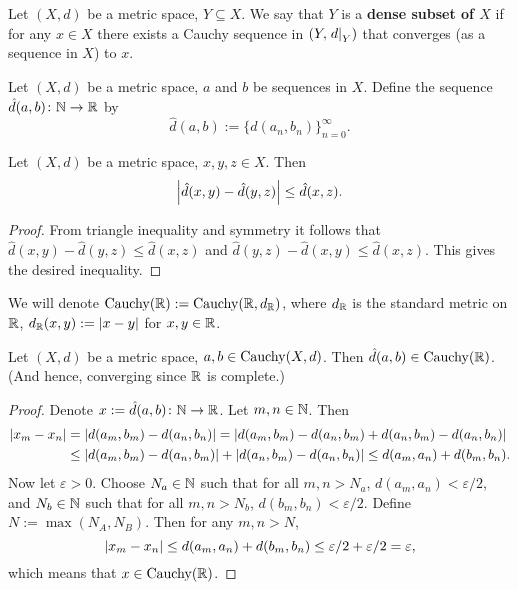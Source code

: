 \begin{definition}
  Let $(X, d)$ be a metric space, $Y \subseteq X$.
  We say that $Y$ is a \textbf{dense subset of $X$} if
  for any $x \in X$ there exists a Cauchy sequence in $(Y, \left. d \right|_{Y})$
  that converges (as a sequence in $X$) to $x$.
\end{definition}
\begin{definition}
  Let $(X, d)$ be a metric space, $a$ and $b$ be sequences in $X$.
  Define the sequence $\hat{d}(a, b) \colon \mathbb{N} \to \mathbb{R}$ by
  \begin{equation}
    \hat{d}(a, b) := \{d(a_n, b_n)\}_{n = 0}^\infty.
  \end{equation}
\end{definition}
\begin{proposition}
  Let $(X, d)$ be a metric space, $x, y, z \in X$.
  Then
  \begin{equation}
    \left\lvert\hat{d}(x, y) - \hat{d}(y, z)\right\rvert \leq \hat{d}(x, z).
  \end{equation}
\end{proposition}
\begin{proof}
  From triangle inequality and symmetry it follows that
  $\hat{d}(x, y) - \hat{d}(y, z) \leq \hat{d}(x, z)$ and
  $\hat{d}(y, z) - \hat{d}(x, y) \leq \hat{d}(x, z)$.
  This gives the desired inequality.
\end{proof}
\begin{notation}
  We will denote $\mathop{\rm Cauchy}\nolimits(\mathbb{R}) := \mathop{\rm Cauchy}\nolimits(\mathbb{R}, d_{\mathbb{R}})$, where
  $d_{\mathbb{R}}$ is the standard metric on $\mathbb{R}$,
  $d_{\mathbb{R}}(x, y) := \left\lvert x - y\right\rvert$ for $x, y \in \mathbb{R}$.
\end{notation}
\begin{proposition}
  Let $(X, d)$ be a metric space, $a, b \in \mathop{\rm Cauchy}\nolimits(X, d)$.
  Then $\hat{d}(a, b) \in \mathop{\rm Cauchy}\nolimits(\mathbb{R})$.
  (And hence, converging since $\mathbb{R}$ is complete.)
\end{proposition}
\begin{proof}
  Denote $x := \hat{d}(a, b) \colon \mathbb{N} \to \mathbb{R}$.
  Let $m, n \in \mathbb{N}$.
  Then
  \begin{equation}
    \begin{split}
      \left\lvert x_m - x_n\right\rvert
      & = \left\lvert d(a_m, b_m) - d(a_n, b_n)\right\rvert
        = \left\lvert d(a_m, b_m) - d(a_n, b_m) + d(a_n, b_m) - d(a_n, b_n)\right\rvert \\
      & \leq \left\lvert d(a_m, b_m) - d(a_n, b_m)\right\rvert + \left\lvert d(a_n, b_m) - d(a_n, b_n)\right\rvert
        \leq d(a_m, a_n) + d(b_m, b_n).
    \end{split}
  \end{equation}
  Now let $\varepsilon > 0$.
  Choose $N_a \in \mathbb{N}$ such that
  for all $m, n > N_a$, $d(a_m, a_n) < \varepsilon / 2$,
  and $N_b \in \mathbb{N}$ such that
  for all $m, n > N_b$, $d(b_m, b_n) < \varepsilon / 2$.
  Define $N := \max(N_A, N_B)$.
  Then for any $m, n > N$,
  \begin{equation}
    \left\lvert x_m - x_n\right\rvert
    \leq d(a_m, a_n) + d(b_m, b_n)
    \leq \varepsilon / 2 + \varepsilon / 2
    = \varepsilon,
  \end{equation}
  which means that $x \in \mathop{\rm Cauchy}\nolimits(\mathbb{R})$.
\end{proof}
